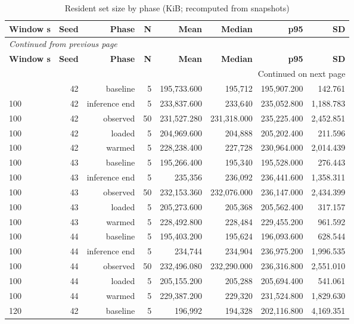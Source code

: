\documentclass[10pt,a4paper]{article}
\begin{document}
\begin{longtable}{@{}lrrrrrrr@{}}
\caption{Resident set size by phase (KiB; recomputed from snapshots)}\\
\toprule
\textbf{Window s} & \textbf{Seed} & \textbf{Phase} & \textbf{N} & \textbf{Mean} & \textbf{Median} & \textbf{p95} & \textbf{SD} \\
\midrule\endfirsthead
\multicolumn{8}{l}{\small\itshape Continued from previous page}\\
\toprule
\textbf{Window s} & \textbf{Seed} & \textbf{Phase} & \textbf{N} & \textbf{Mean} & \textbf{Median} & \textbf{p95} & \textbf{SD} \\
\midrule\endhead
\midrule\multicolumn{8}{r}{\small Continued on next page}\\\endfoot
\bottomrule\endlastfoot
100 & 42 & baseline & 5 & 195,733.600 & 195,712 & 195,907.200 & 142.761 \\
100 & 42 & inference end & 5 & 233,837.600 & 233,640 & 235,052.800 & 1,188.783 \\
100 & 42 & observed & 50 & 231,527.280 & 231,318.000 & 235,225.400 & 2,452.851 \\
100 & 42 & loaded & 5 & 204,969.600 & 204,888 & 205,202.400 & 211.596 \\
100 & 42 & warmed & 5 & 228,238.400 & 227,728 & 230,964.000 & 2,014.439 \\
100 & 43 & baseline & 5 & 195,266.400 & 195,340 & 195,528.000 & 276.443 \\
100 & 43 & inference end & 5 & 235,356 & 236,092 & 236,441.600 & 1,358.311 \\
100 & 43 & observed & 50 & 232,153.360 & 232,076.000 & 236,147.000 & 2,434.399 \\
100 & 43 & loaded & 5 & 205,273.600 & 205,368 & 205,562.400 & 317.157 \\
100 & 43 & warmed & 5 & 228,492.800 & 228,484 & 229,455.200 & 961.592 \\
100 & 44 & baseline & 5 & 195,403.200 & 195,624 & 196,093.600 & 628.544 \\
100 & 44 & inference end & 5 & 234,744 & 234,904 & 236,975.200 & 1,996.535 \\
100 & 44 & observed & 50 & 232,496.080 & 232,290.000 & 236,316.800 & 2,551.010 \\
100 & 44 & loaded & 5 & 205,155.200 & 205,288 & 205,694.400 & 541.061 \\
100 & 44 & warmed & 5 & 229,387.200 & 229,320 & 231,524.800 & 1,829.630 \\
120 & 42 & baseline & 5 & 196,992 & 194,328 & 202,116.800 & 4,169.351 \\

\end{longtable}
\end{document}
